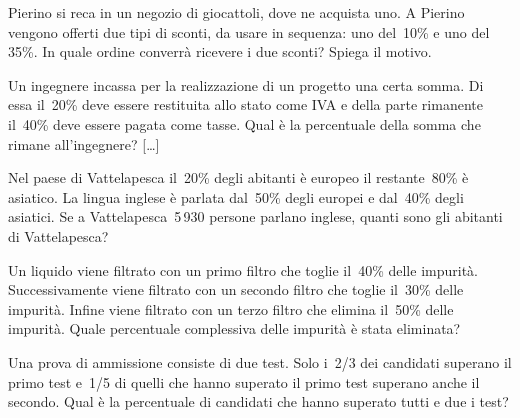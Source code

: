 \begin{htmulticols}{2}
\begin{esercizio}
\label{ese:3.206}
Pierino si reca in un negozio di giocattoli, dove ne acquista uno. A
Pierino vengono offerti due tipi di sconti, da usare in sequenza: uno 
del~10\% e uno del
35\%. In quale ordine converrà ricevere i due sconti? Spiega il
motivo. \sol{\dots}
\end{esercizio}


\begin{esercizio}
\label{ese:3.208}
Un ingegnere incassa per la realizzazione di un progetto una
certa somma. Di essa il~20\% deve essere restituita allo stato come IVA
e della parte rimanente il~40\% deve essere pagata come tasse. Qual è
la percentuale della somma che rimane all'ingegnere? \hfill [\dots]
\end{esercizio}

\begin{esercizio}
\label{ese:3.209}
Nel paese di Vattelapesca il~20\% degli abitanti è europeo il
restante~80\% è asiatico. La lingua inglese è parlata dal~50\% degli
europei e dal~40\% degli asiatici. Se a Vattelapesca~5\,930 persone
parlano inglese, quanti sono gli abitanti di Vattelapesca? \sol{\dots}
\end{esercizio}

\begin{esercizio}
\label{ese:3.210}
Un liquido viene filtrato con un primo filtro che toglie il~40\%
delle impurità. Successivamente viene filtrato con un secondo filtro
che toglie il~30\% delle impurità. Infine viene filtrato con un terzo
filtro che elimina il~50\% delle impurità. Quale percentuale
complessiva delle impurità è stata eliminata? \sol{\dots}
\end{esercizio}

\begin{esercizio}
\label{ese:3.211}
Una prova di ammissione consiste di due test. Solo i~2/3 dei
candidati superano il primo test e~1/5 di quelli che hanno superato il
primo test superano anche il secondo. Qual è la percentuale di
candidati che hanno superato tutti e due i test? \sol{\dots}
\end{esercizio}


\end{htmulticols}
